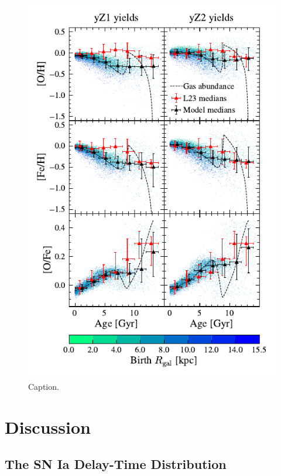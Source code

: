 \documentclass[twocolumn,twocolappendix,linenumbers]{aastex631}
\begin{document}
\begin{figure}
    \centering
    \includegraphics{figures/abundance_evolution_yields.pdf}
    \caption{Caption.}
    \label{fig:abund-evol-yields}
\end{figure}

\section{Discussion}
\label{sec:discussion}

\subsection{The SN Ia Delay-Time Distribution}
\label{sec:dtd-discussion}
\end{document}
